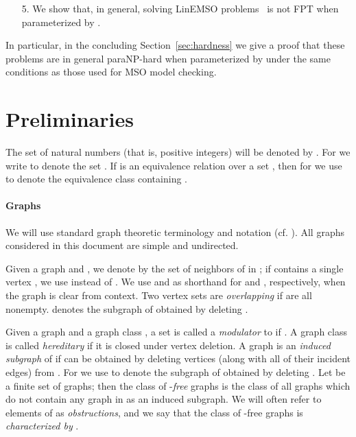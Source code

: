 \documentclass{llncs}
\begin{document}
\begin{enumerate}[leftmargin=*,nosep]
\item[5.] We show that, in general, solving LinEMSO problems~\cite{CourcelleMakowskyRotics00,GanianHlineny10} is not FPT when parameterized by .
\end{enumerate}
\smallskip
In particular, in the concluding Section~\ref{sec:hardness} we give a proof that these problems are in general paraNP-hard when parameterized by  under the same conditions as those used for MSO model checking. 








\section{Preliminaries}\label{sec:prel}
The set of natural numbers (that is, positive integers) will be denoted by
. For  we write  to denote the set . If  is an equivalence relation over a set , then for  we use  to denote the equivalence class containing .

\paragraph{Graphs} We will use standard graph theoretic terminology and notation
(cf. \cite{Diestel00}). All graphs considered in this document are simple and undirected. 

Given a graph  and , we denote by  the set of neighbors of  in ; if  contains a single vertex , we use  instead of . We use  and  as shorthand for  and , respectively, when the graph is clear from context. Two vertex sets  are \emph{overlapping} if  are all nonempty.  denotes the subgraph of  obtained by deleting .

Given a graph  and a graph class , a set  is called a \emph{modulator} to  if . A graph class is called \emph{hereditary} if it is closed under vertex deletion. A graph  is an \emph{induced subgraph} of  if  can be obtained by deleting vertices (along with all of their incident edges) from . For  we use  to denote the subgraph of  obtained by deleting . Let  be a finite set of graphs; then the class of -\emph{free} graphs is the class of all graphs which do not contain any graph in  as an induced subgraph. We will often refer to elements of  as \emph{obstructions}, and we say that the class of -free graphs is \emph{characterized by }.
\end{document}
